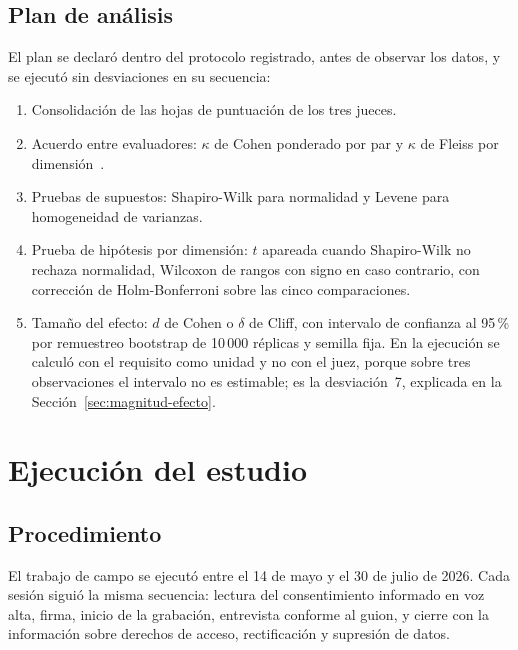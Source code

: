 \documentclass[11pt,a4paper]{article}
\begin{document}
\subsection{Plan de an\'alisis}

El plan se declar\'o dentro del protocolo registrado, antes de observar los datos, y se
ejecut\'o sin desviaciones en su secuencia:

\begin{enumerate}[leftmargin=*,nosep]
  \item Consolidaci\'on de las hojas de puntuaci\'on de los tres jueces.
  \item Acuerdo entre evaluadores: $\kappa$ de Cohen ponderado por par y $\kappa$ de
        Fleiss por dimensi\'on~\cite{cohen1960coefficient,fleiss1971measuring}.
  \item Pruebas de supuestos: Shapiro-Wilk para normalidad y Levene para homogeneidad de
        varianzas.
  \item Prueba de hip\'otesis por dimensi\'on: $t$ apareada cuando Shapiro-Wilk no
        rechaza normalidad, Wilcoxon de rangos con signo en caso contrario, con
        correcci\'on de Holm-Bonferroni sobre las cinco comparaciones.
  \item Tama\~no del efecto: $d$ de Cohen o $\delta$ de Cliff, con intervalo de
        confianza al 95\,\% por remuestreo bootstrap de 10\,000 r\'eplicas y semilla
        fija. En la ejecuci\'on se calcul\'o con el requisito como unidad y no con el
        juez, porque sobre tres observaciones el intervalo no es estimable; es la
        desviaci\'on~7, explicada en la Secci\'on~\ref{sec:magnitud-efecto}.
\end{enumerate}

\section{Ejecuci\'on del estudio}

\subsection{Procedimiento}

El trabajo de campo se ejecut\'o entre el 14 de mayo y el 30 de julio de 2026. Cada
sesi\'on sigui\'o la misma secuencia: lectura del consentimiento informado en voz alta,
firma, inicio de la grabaci\'on, entrevista conforme al guion, y cierre con la
informaci\'on sobre derechos de acceso, rectificaci\'on y supresi\'on de datos.
\end{document}
